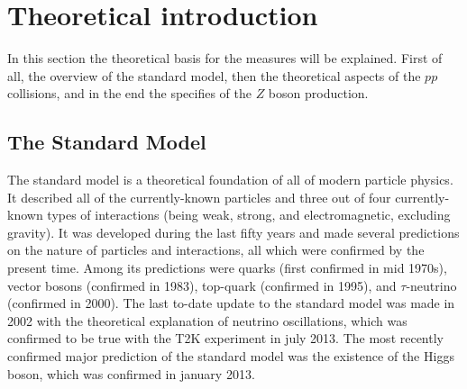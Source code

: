 \chapter{Theoretical introduction}
\label{sec:Theory}

In this section the theoretical basis for the measures will be explained. First of all, the overview of the standard model, then the theoretical aspects of the $pp$ collisions, and in the end the specifies of the $Z$ boson production.

\section{The Standard Model}
\label{sec:theory_SM}

The standard model is a theoretical foundation of all of modern particle physics. It described all of the currently-known particles and three out of four currently-known types of interactions (being weak, strong, and electromagnetic, excluding gravity). It was developed during the last fifty years and made several predictions on the nature of particles and interactions, all which were confirmed by the present time. Among its predictions were quarks (first confirmed in mid 1970s), vector bosons (confirmed in 1983), top-quark (confirmed in 1995), and $\tau$-neutrino (confirmed in 2000). The last to-date update to the standard model was made in 2002 with the theoretical explanation of neutrino oscillations, which was confirmed to be true with the T2K experiment in july 2013. The most recently confirmed major prediction of the standard model was the existence of the Higgs boson, which was confirmed in january 2013.

